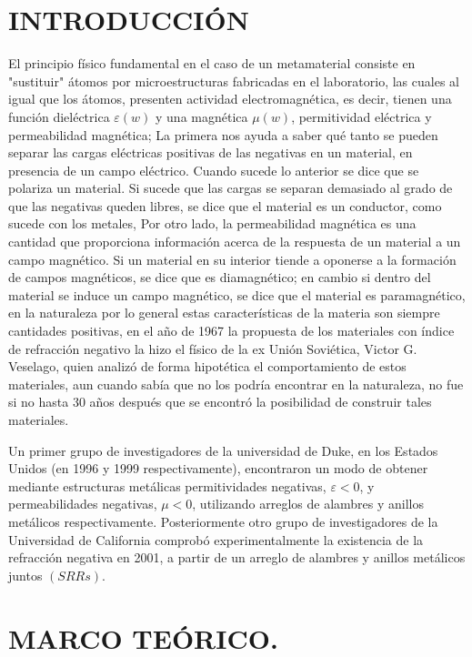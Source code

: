 \documentclass[11pt,letterpaper,twocolumn]{article}
\begin{document}
\section{\normalsize{INTRODUCCIÓN}}
El principio físico fundamental en el caso de un metamaterial consiste en "sustituir" átomos por microestructuras fabricadas en el laboratorio, las cuales al igual que los átomos, presenten actividad electromagnética, es decir, tienen una función dieléctrica $\varepsilon (w)$ y una magnética $\mu (w)$, permitividad eléctrica y permeabilidad  magnética; La primera nos ayuda a saber qué tanto se pueden separar las cargas eléctricas positivas de las negativas en un material, en presencia de un campo eléctrico. Cuando sucede lo anterior se dice que se polariza un material. Si sucede que las cargas se separan demasiado al grado de que las negativas queden libres, se dice que el material es un conductor, como sucede con los metales, Por otro lado, la permeabilidad magnética es una cantidad que proporciona información acerca de la respuesta de un material a un campo magnético. Si un material en su interior tiende a oponerse a la formación de campos magnéticos, se dice que es diamagnético; en cambio si dentro del material se induce un campo magnético, se dice que el material es paramagnético, en la naturaleza por lo general estas  características de la materia son siempre cantidades positivas, en el año de 1967 la propuesta de los materiales con índice de refracción negativo la hizo el físico de la ex Unión Soviética, Victor G. Veselago, quien analizó de forma hipotética el comportamiento de estos materiales, aun cuando sabía que no los podría encontrar en la naturaleza, no fue si no hasta 30 años después que se encontró la posibilidad de construir tales materiales.

Un primer grupo de investigadores de la universidad de Duke, en los Estados Unidos (en 1996 y 1999 respectivamente), encontraron un modo de obtener mediante estructuras metálicas permitividades negativas, $\varepsilon<0$, y permeabilidades negativas, $\mu<0$, utilizando arreglos de alambres y anillos metálicos respectivamente. Posteriormente otro grupo de investigadores de la Universidad de California comprobó experimentalmente la existencia de la refracción negativa en 2001, a partir de un arreglo de alambres y anillos metálicos juntos $ (SRRs)$.
 
\section{\normalsize{MARCO TEÓRICO.}}
\end{document}
